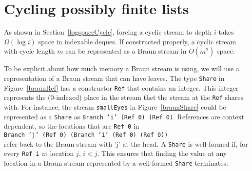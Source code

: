 \documentclass{llncs}
\begin{document}
\section{Cycling possibly finite lists}

As shown in Section~\ref{logspaceCycle}, forcing a cyclic stream to depth $i$ takes $\Omega(\log i)$ space in indexable deques.
If constructed properly, a cyclic stream with cycle length $m$ can be represented as a Braun stream in $O(m^2)$ space.

To be explicit about how much memory a Braun stream is using, we will use a representation of a Braun stream that can have leaves.
The type {\tt Share} in Figure~\ref{braunRef} has a constructor {\tt Ref} that contains an integer.
This integer represents the (0-indexed) place in the stream thet the stream at the {\tt Ref} shares with.
For instance, the stream {\tt smallEyes} in Figure~\ref{braunShare} could be represented as a {\tt Share} as {\tt Branch 'i' (Ref 0) (Ref 0)}.
References are context dependent, so the locations that are {\tt Ref 0} in 
\\
{\tt Branch 'j' (Ref 0) (Branch 'i' (Ref 0) (Ref 0))}
\\
refer back to the Braun stream with 'j' at the head.
A {\tt Share} is well-formed if, for every {\tt Ref i} at location $j$, $i < j$.
This ensures that finding the value at any location in a Braun stream represented by a well-formed {\tt Share} terminates.
\end{document}
